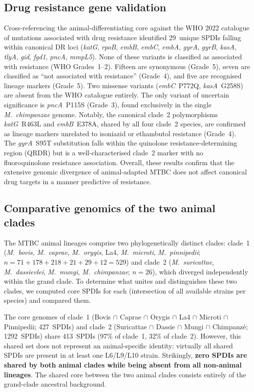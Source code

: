 \documentclass[11pt,a4paper]{article}
\newcommand{\Msur}{\textit{M.~suricattae}}
\newcommand{\Mmun}{\textit{M.~mungi}}
\newcommand{\Mdas}{\textit{M.~dassievlei}}
\newcommand{\Mchi}{\textit{M.~chimpanzae}}
\begin{document}
\subsection{Drug resistance gene validation}
\label{sec:results:dr}

Cross-referencing the animal-differentiating core against the WHO 2022 catalogue of
mutations associated with drug resistance identified 29~unique SPDIs falling
within canonical DR loci (\textit{katG}, \textit{rpoB}, \textit{embB},
\textit{embC}, \textit{embA}, \textit{gyrA}, \textit{gyrB}, \textit{kasA},
\textit{tlyA}, \textit{gid}, \textit{fgd1}, \textit{pncA}, \textit{mmpL5}).
%
None of these variants is classified as associated with resistance (WHO
Grades~1--2). Fifteen are synonymous (Grade~5), seven are classified as
``not associated with resistance'' (Grade~4), and five are recognised
lineage markers (Grade~5). Two missense variants (\textit{embC}~P772Q,
\textit{kasA}~G258S) are absent from the WHO catalogue entirely. The only
variant of uncertain significance is \textit{pncA}~P115S (Grade~3), found
exclusively in the single \Mchi{} genome.
%
Notably, the canonical clade~2 polymorphisms \textit{katG}~R463L and
\textit{embB}~E378A, shared by all four clade~2 species, are confirmed as
lineage markers unrelated to isoniazid or ethambutol resistance (Grade~4).
%
The \textit{gyrA}~S95T substitution falls within the quinolone
resistance-determining region (QRDR) but is a well-characterised
clade~2 marker with no fluoroquinolone resistance association.
%
Overall, these results confirm that the extensive genomic divergence of
animal-adapted MTBC does not affect canonical drug targets in a manner
predictive of resistance.

\subsection{Comparative genomics of the two animal clades}
\label{sec:results:inter_clade}

The MTBC animal lineages comprise two phylogenetically distinct clades:
clade~1 (\textit{M.~bovis}, \textit{M.~caprae}, \textit{M.~orygis},
La4, \textit{M.~microti}, \textit{M.~pinnipedii};
$n = 71 + 178 + 218 + 21 + 29 + 12 = 529$) and clade~2 (\Msur{}, \Mdas{},
\Mmun{}, \Mchi{}; $n = 26$), which diverged independently within the
grand clade.
%
To determine what unites and distinguishes these two clades, we computed
core SPDIs for each (intersection of all available strains per species)
and compared them.

The core genomes of clade~1 (Bovis $\cap$ Caprae $\cap$ Orygis $\cap$
La4 $\cap$ Microti $\cap$ Pinnipedii; 427~SPDIs) and clade~2 (Suricattae $\cap$ Dassie
$\cap$ Mungi $\cap$ Chimpanzé; \num{1292}~SPDIs) share 413~SPDIs (97\% of
clade~1, 32\% of clade~2).
%
However, this shared set does not represent an animal-specific identity:
virtually all shared SPDIs are present in at least one L6/L9/L10 strain.
%
Strikingly, \textbf{zero SPDIs are shared by both animal clades while
being absent from all non-animal lineages}.
%
The shared core between the two animal clades consists entirely of the
grand-clade ancestral background.
\end{document}
